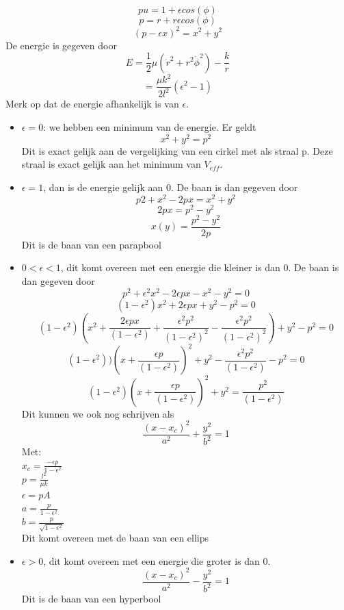 $$pu=1+\epsilon cos(\phi)$$
$$p=r+r\epsilon cos(\phi)$$
$$(p-\epsilon x)^{2}=x^{2}+y^{2}$$
De energie is gegeven door
$$E=\frac{1}{2}\mu(\dot{r}^{2}+r^{2}\dot{\phi}^{2})-\frac{k}{r}$$
$$=\frac{\mu k^{2}}{2l^{2}}(\epsilon^{2}-1)$$
Merk op dat de energie afhankelijk is van $\epsilon$. 
\begin{itemize}
\item  $\epsilon=0$: we hebben een minimum van de energie. Er geldt
$$x^{2}+y^{2}=p^{2}$$
Dit is exact gelijk aan de vergelijking van een cirkel met als straal p. Deze straal is exact gelijk aan het minimum van $V_{eff}$. 
\item $\epsilon=1$, dan is de energie gelijk aan 0. De baan is dan gegeven door
$$p{2}+x^{2}-2px=x^{2}+y^{2}$$
$$2px=p^{2}-y^{2}$$
$$x(y)=\frac{p^{2}-y^{2}}{2p}$$
Dit is de baan van een parapbool
\item $0<\epsilon<1$, dit komt overeen met een energie die kleiner is dan 0. De baan is dan gegeven door
$$p^{2}+\epsilon^{2}x^{2}-2\epsilon px-x^{2}-y^{2}=0$$
$$(1-\epsilon^{2})x^{2}+2\epsilon px+y^{2}-p^{2}=0$$
$$(1-\epsilon^{2})(x^{2}+\frac{2\epsilon px}{(1-\epsilon^{2})}+\frac{\epsilon^{2}p^{2}}{(1-\epsilon^{2})^{2}}-\frac{\epsilon^{2}p^{2}}{(1-\epsilon^{2})^{2}})+y^{2}-p^{2}=0$$
$$(1-\epsilon^{2}))(x+\frac{\epsilon p}{(1-\epsilon^{2})})^{2}+y^{2}-\frac{\epsilon^{2}p^{2}}{(1-\epsilon^{2})}-p^{2}=0$$
$$(1-\epsilon^{2})(x+\frac{\epsilon p}{(1-\epsilon^{2})})^{2}+y^{2}=\frac{p^{2}}{(1-\epsilon^{2})}$$
Dit kunnen we ook nog schrijven als
$$\frac{(x-x_{c})^{2}}{a^{2}}+\frac{y^{2}}{b^{2}}=1$$
Met: \\
$x_{c}=\frac{-\epsilon p}{1-\epsilon^{2}}$ \\
$p=\frac{l^{2}}{\mu k}$\\
$\epsilon = pA$\\
$a=\frac{p}{1-\epsilon^{2}}$\\
$b=\frac{p}{\sqrt{1-\epsilon^{2}}}$\\
Dit komt overeen met de baan van een ellips
\item $\epsilon > 0$, dit komt overeen met een energie die groter is dan 0. 
$$\frac{(x-x_{c})^{2}}{a^{2}}-\frac{y^{2}}{b^{2}}=1$$
Dit is de baan van een hyperbool
\end{itemize}

